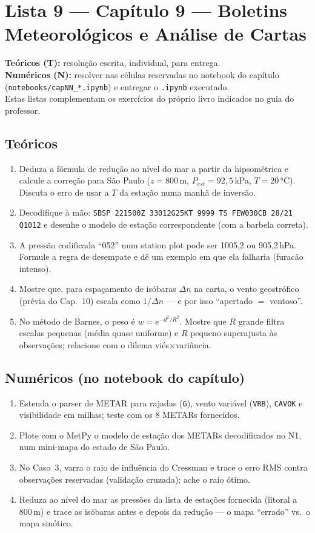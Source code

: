 \documentclass[11pt]{article}
\newcommand{\instrucoes}{%
\begin{caixalista}
\textbf{Teóricos (T):} resolução escrita, individual, para entrega.\\
\textbf{Numéricos (N):} resolver nas células reservadas no notebook do
capítulo (\texttt{notebooks/capNN\_*.ipynb}) e entregar o
\texttt{.ipynb} executado.\\
Estas listas complementam os exercícios do próprio livro indicados no
guia do professor.
\end{caixalista}}
\begin{document}
\clearpage
\section*{Lista 9 --- Capítulo 9 --- Boletins Meteorológicos e Análise de Cartas}
\instrucoes

\subsection*{Teóricos}

\begin{enumerate}[label=\textbf{T\arabic*.},itemsep=4pt]
  \item Deduza a fórmula de redução ao nível do mar a partir da
        hipsométrica e calcule a correção para São Paulo ($z = 800$\,m,
        $P_{est} = 92{,}5$\,kPa, $T = 20\,°$C). Discuta o erro de usar a
        $T$ da estação numa manhã de inversão.
  \item Decodifique à mão:
        \texttt{SBSP 221500Z 33012G25KT 9999 TS FEW030CB 28/21 Q1012} e
        desenhe o modelo de estação correspondente (com a barbela
        correta).
  \item A pressão codificada ``052'' num station plot pode ser 1005{,}2
        ou 905{,}2\,hPa. Formule a regra de desempate e dê um exemplo em
        que ela falharia (furacão intenso).
  \item Mostre que, para espaçamento de isóbaras $\Delta n$ na carta, o
        vento geostrófico (prévia do Cap.~10) escala como $1/\Delta n$ —
        e por isso ``apertado $=$ ventoso''.
  \item No método de Barnes, o peso é $w = e^{-d^2/R^2}$. Mostre que
        $R$ grande filtra escalas pequenas (média quase uniforme) e $R$
        pequeno superajusta às observações; relacione com o dilema
        viés$\times$variância.
\end{enumerate}

\subsection*{Numéricos (no notebook do capítulo)}

\begin{enumerate}[label=\textbf{N\arabic*.},itemsep=4pt]
  \item Estenda o parser de METAR para rajadas (\texttt{G}), vento
        variável (\texttt{VRB}), \texttt{CAVOK} e visibilidade em
        milhas; teste com os 8 METARs fornecidos.
  \item Plote com o MetPy o modelo de estação dos METARs decodificados
        no N1, num mini-mapa do estado de São Paulo.
  \item No Caso~3, varra o raio de influência do Cressman e trace o
        erro RMS contra observações reservadas (validação cruzada);
        ache o raio ótimo.
  \item Reduza ao nível do mar as pressões da lista de estações
        fornecida (litoral a 800\,m) e trace as isóbaras antes e depois
        da redução — o mapa ``errado'' vs.\ o mapa sinótico.
\end{enumerate}
\end{document}
